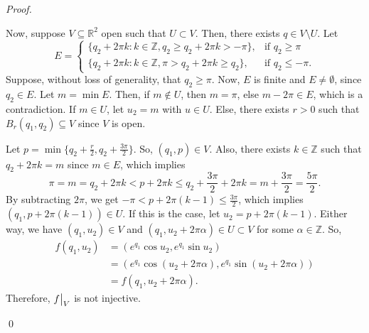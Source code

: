 \documentclass[12pt]{article}
\newenvironment{problem}[2][Problem]{\begin{trivlist}
\item[\hskip \labelsep {\bfseries #1}\hskip \labelsep {\bfseries #2.}]}{\end{trivlist}}
\newenvironment{sol}
    {\emph{Proof.}
    }
    {
    \qed
    }
\newcommand\restr[2]{{%
  \left.\kern-\nulldelimiterspace %
  #1 %
  \vphantom{\big|} %
  \right|_{#2} %
  }}
\begin{document}
\begin{problem}{26}
\begin{itemize}
\begin{sol}
   \hspace{1em} Now, suppose $V \subseteq \mathbb{R}^2$ open such that $U \subset V$. Then, there exists $q \in V \setminus U$. Let $$E = \begin{cases} 
      \{q_2 + 2\pi k : k \in \mathbb{Z},q_2 \geq q_2 + 2\pi k > -\pi\}, & \text{if } q_2 \geq \pi \\
      \{q_2 + 2\pi k : k \in \mathbb{Z},\pi > q_2 + 2 \pi k \geq q_2\}, & \text{if } q_2 \leq -\pi.
   \end{cases}$$
    \hspace{1em} Suppose, without loss of generality, that $q_2 \geq \pi$. Now, $E$ is finite and $E \neq \emptyset$, since $q_2 \in E$. Let $m = \min E$. Then, if $m \not \in U$, then $m = \pi$, else $m - 2\pi \in E$, which is a contradiction. If $m \in U$, let $u_2 = m$ with $u \in U$. Else, there exists $r > 0$ such that $B_r(q_1,q_2) \subseteq V$ since $V$ is open.
    
    \hspace{1em} Let $p = \min\{q_2 + \frac{r}{2}, q_2 + \frac{3\pi}{2}\}$. So, $(q_1,p) \in V$. Also, there exists $k \in \mathbb{Z}$ such that $q_2 + 2 \pi k = m$ since $m \in E$, which implies $$\pi = m = q_2 + 2 \pi k < p + 2 \pi k \leq q_2 + \frac{3\pi}{2} + 2\pi k = m + \frac{3 \pi}{2} = \frac{5 \pi}{2}.$$ By subtracting $2 \pi$, we get $-\pi < p + 2 \pi (k-1) \leq \frac{3 \pi}{2}$, which implies $(q_1,p+2\pi (k-1)) \in U$. If this is the case, let $u_2 = p + 2 \pi (k-1)$. Either way, we have $(q_1,u_2) \in V$ and $(q_1,u_2 + 2 \pi \alpha) \in U \subset V$ for some $\alpha \in \mathbb{Z}$. So, \begin{align*}
        f(q_1,u_2) &= (e^{q_1}\cos u_2, e^{q_1} \sin u_2) \\ &= (e^{q_1} \cos (u_2 + 2 \pi \alpha),e^{q_1} \sin (u_2 + 2 \pi \alpha)) \\ &= f(q_1,u_2 + 2\pi \alpha).
    \end{align*}
    Therefore, $\restr{f}{V}$ is not injective.
    \end{sol}
\end{itemize}
\end{problem}
\end{document}
